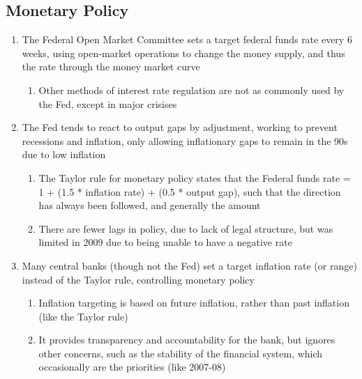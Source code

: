 \documentclass[11 pt, twoside]{article}
\begin{document}
\subsection{Monetary Policy}
\begin{enumerate}
\item The Federal Open Market Committee sets a target federal funds rate every 6 weeks, using open-market operations to change the money supply, and thus the rate through the money market curve
\begin{enumerate}
\item Other methods of interest rate regulation are not as commonly used by the Fed, except in major crisises
\end{enumerate}
\item The Fed tends to react to output gaps by adjustment, working to prevent recessions and inflation, only allowing inflationary gaps to remain in the 90s due to low inflation
\begin{enumerate}
\item The Taylor rule for monetary policy states that the Federal funds rate = 1 + (1.5 * inflation rate) + (0.5 * output gap), such that the direction has always been followed, and generally the amount
\item There are fewer lags in policy, due to lack of legal structure, but was limited in 2009 due to being unable to have a negative rate
\end{enumerate}
\item Many central banks (though not the Fed) set a target inflation rate (or range) instead of the Taylor rule, controlling monetary policy
\begin{enumerate}
\item Inflation targeting is based on future inflation, rather than past inflation (like the Taylor rule)
\item It provides transparency and accountability for the bank, but ignores other concerns, such as the stability of the financial system, which occasionally are the priorities (like 2007-08)
\end{enumerate}
\end{enumerate}
\end{document}
